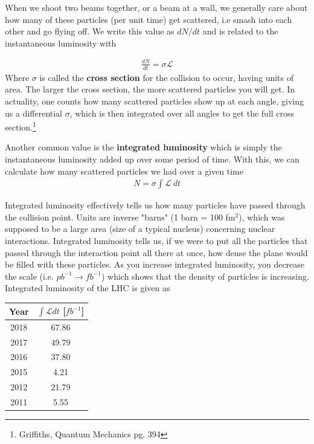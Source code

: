 When we shoot two beams together, or a beam at a wall, we generally care about how many of these particles (per unit time) get scattered, i.e smash into each other and go flying off. We write this value as $dN/dt$ and is related to the instantaneous luminosity with

\begin{align}
\frac{dN}{dt} = \sigma\mathcal{L}
\end{align}
Where $\sigma$ is called the \textbf{cross section} for the collision to occur, having units of area. The larger the cross section, the more scattered particles you will get. In actuality, one counts how many scattered particles show up at each angle, giving us a differential $\sigma$, which is then integrated over all angles to get the full cross section.\footnote{Griffiths, Quantum Mechanics pg. 394}


Another common value is the \textbf{integrated luminosity} which is simply the instantaneous luminosity added up over some period of time. With this, we can calculate how many scattered particles we had over a given time
\begin{align}
N = \sigma \int \mathcal{L}~dt
\end{align}

Integrated luminosity effectively tells us how many particles have passed through the collision point.  Units are inverse "barns" (1 barn = 100 fm$^2$), which was supposed to be a large area (size of a typical nucleus) concerning nuclear interactions. Integrated luminosity tells us, if we were to put all the particles that passed through the interaction point all there at once, how dense the plane would be filled with these particles. As you increase integrated luminosity, you decrease the scale (i.e. $pb^{-1} \rightarrow fb^{-1}$) which shows that the density of particles is increasing. Integrated luminosity of the LHC is given as

\begin{center}
\begin{tabular}{ | c | c|} 
\hline
 Year & $\int \mathcal{L} dt$ [$fb^{-1}$] \\ \hline
 2018 & 67.86  \\ 
 2017 & 49.79  \\
2016 & 37.80   \\ 
2015 & 4.21 \\
2012 & 21.79 \\
2011 & 5.55\\
\hline
\end{tabular}
\end{center}

